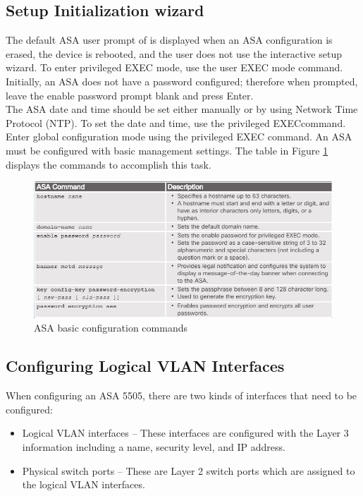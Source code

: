 \subsection{Setup Initialization wizard}

The default ASA user prompt of  is displayed when an ASA configuration is erased, the device is rebooted, and the user does not use the interactive setup wizard. To enter privileged EXEC mode, use the  user EXEC mode command. Initially, an ASA does not have a password configured; therefore when prompted, leave the enable password prompt blank and press Enter.\\

The ASA date and time should be set either manually or by using Network Time Protocol (NTP). To set the date and time, use the  privileged EXECcommand. Enter global configuration mode using the  privileged EXEC command. An ASA must be configured with basic management settings. The table in Figure \ref{ASAbasic} displays the commands to accomplish this task.

\begin{figure}[hbtp]
\caption{ASA basic configuration commands}\label{ASAbasic}
\centering
\includegraphics[scale=0.5]{pictures/ASAbasic.PNG}
\end{figure}

\subsection{Configuring Logical VLAN Interfaces}

When configuring an ASA 5505, there are two kinds of interfaces that need to be configured:

\begin{itemize}
\item Logical VLAN interfaces -- These interfaces are configured with the Layer 3 information including a name, security level, and IP address.
\item Physical switch ports -- These are Layer 2 switch ports which are assigned to the logical VLAN interfaces.
\end{itemize}

